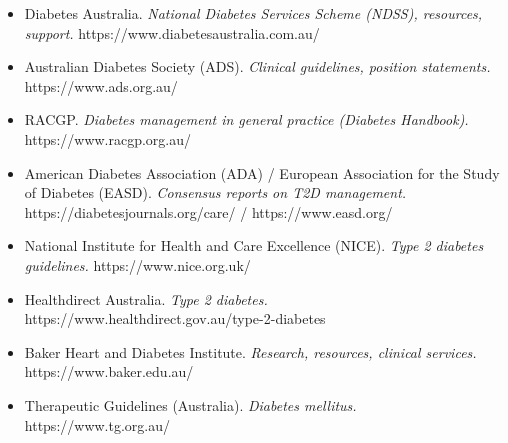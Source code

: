 \begin{itemize}
    \item Diabetes Australia. \textit{National Diabetes Services Scheme (NDSS), resources, support.} https://www.diabetesaustralia.com.au/
    \item Australian Diabetes Society (ADS). \textit{Clinical guidelines, position statements.} https://www.ads.org.au/
    \item RACGP. \textit{Diabetes management in general practice (Diabetes Handbook).} https://www.racgp.org.au/
    \item American Diabetes Association (ADA) / European Association for the Study of Diabetes (EASD). \textit{Consensus reports on T2D management.} https://diabetesjournals.org/care/ / https://www.easd.org/
    \item National Institute for Health and Care Excellence (NICE). \textit{Type 2 diabetes guidelines.} https://www.nice.org.uk/
    \item Healthdirect Australia. \textit{Type 2 diabetes.} https://www.healthdirect.gov.au/type-2-diabetes
    \item Baker Heart and Diabetes Institute. \textit{Research, resources, clinical services.} https://www.baker.edu.au/
    \item Therapeutic Guidelines (Australia). \textit{Diabetes mellitus.} https://www.tg.org.au/
\end{itemize}